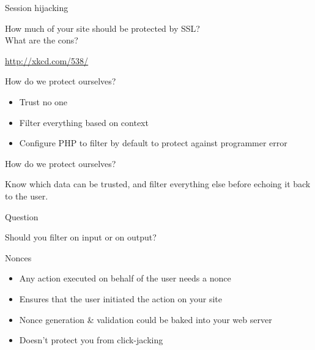 \documentclass{beamer}
\begin{document}
\begin{frame}{Session hijacking}
\begin{center}
How much of your site should be protected by SSL? \\
What are the cons?
\end{center}
\end{frame}

\begin{frame}{}
\parbox[c][0.6\paperheight]{\paperwidth}{ }
\parbox[c][0.2\paperheight]{\paperwidth}{ \tiny{\href{http://xkcd.com/538/}{http://xkcd.com/538/}} }
\end{frame}



\begin{frame}{How do we protect ourselves?}
\begin{itemize}
\item Trust no one
\item Filter everything based on context
\item Configure PHP to filter by default to protect against programmer error
\end{itemize}
\end{frame}

\begin{frame}{How do we protect ourselves?}
\begin{center}
Know which data can be trusted, and filter everything else before echoing it back to the user.
\end{center}
\end{frame}

\begin{frame}{Question}
\begin{center}
Should you filter on input or on output?
\end{center}
\end{frame}

\begin{frame}{Nonces}
\begin{itemize}
\item Any action executed on behalf of the user needs a nonce
\item Ensures that the user initiated the action on your site
\item Nonce generation \& validation could be baked into your web server
\item Doesn't protect you from click-jacking
\end{itemize}
\end{frame}
\end{document}
